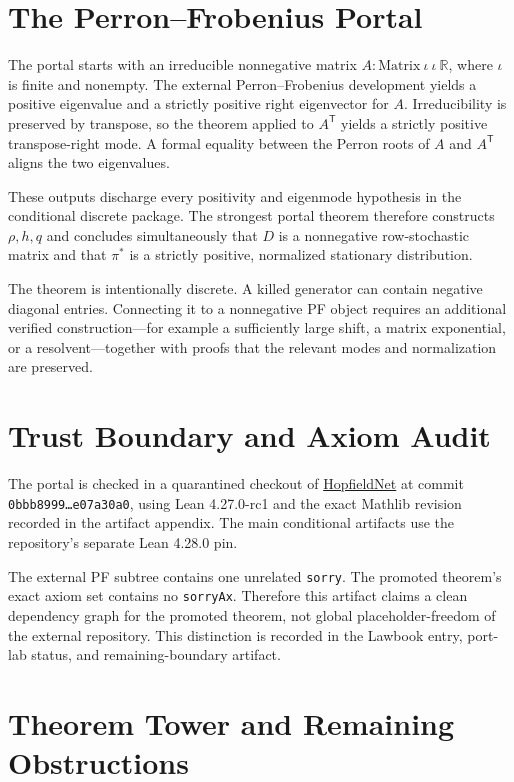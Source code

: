 \documentclass[11pt]{article}
\begin{document}
\section{The Perron--Frobenius Portal}

The portal starts with an irreducible nonnegative matrix
\(A:\mathrm{Matrix}\ \iota\ \iota\ \mathbb{R}\), where \(\iota\) is finite and
nonempty. The external Perron--Frobenius development yields a positive
eigenvalue and a strictly positive right eigenvector for \(A\). Irreducibility
is preserved by transpose, so the theorem applied to \(A^\mathsf{T}\) yields a
strictly positive transpose-right mode. A formal equality between the Perron
roots of \(A\) and \(A^\mathsf{T}\) aligns the two eigenvalues.

These outputs discharge every positivity and eigenmode hypothesis in the
conditional discrete package. The strongest portal theorem therefore
constructs \(\rho,h,q\) and concludes simultaneously that \(D\) is a
nonnegative row-stochastic matrix and that \(\pi^*\) is a strictly positive,
normalized stationary distribution.

The theorem is intentionally discrete. A killed generator can contain negative
diagonal entries. Connecting it to a nonnegative PF object requires an
additional verified construction---for example a sufficiently large shift, a
matrix exponential, or a resolvent---together with proofs that the relevant
modes and normalization are preserved.

\section{Trust Boundary and Axiom Audit}

The portal is checked in a quarantined checkout of
\href{https://github.com/mkaratarakis/HopfieldNet}{HopfieldNet} at commit
\texttt{0bbb8999\ldots e07a30a0}, using Lean 4.27.0-rc1 and the exact Mathlib
revision recorded in the artifact appendix. The main conditional
artifacts use the repository's separate Lean 4.28.0 pin.

The external PF subtree contains one unrelated \texttt{sorry}. The promoted
theorem's exact axiom set contains no \texttt{sorryAx}. Therefore this artifact
claims a clean dependency graph for the promoted theorem, not global
placeholder-freedom of the external repository. This distinction is recorded
in the Lawbook entry, port-lab status, and remaining-boundary artifact.

\section{Theorem Tower and Remaining Obstructions}
\end{document}
